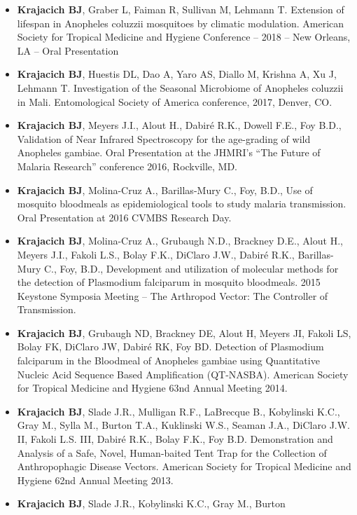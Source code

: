 \documentclass[11pt, a4paper]{awesome-cv}
\begin{document}
\begin{itemize}
\item
  \textbf{Krajacich BJ}, Graber L, Faiman R, Sullivan M, Lehmann T.
  Extension of lifespan in Anopheles coluzzii mosquitoes by climatic
  modulation. American Society for Tropical Medicine and Hygiene
  Conference -- 2018 -- New Orleans, LA -- Oral Presentation
\item
  \textbf{Krajacich BJ}, Huestis DL, Dao A, Yaro AS, Diallo M, Krishna
  A, Xu J, Lehmann T. Investigation of the Seasonal Microbiome of
  Anopheles coluzzii in Mali. Entomological Society of America
  conference, 2017, Denver, CO.
\item
  \textbf{Krajacich BJ}, Meyers J.I., Alout H., Dabiré R.K., Dowell
  F.E., Foy B.D., Validation of Near Infrared Spectroscopy for the
  age-grading of wild Anopheles gambiae. Oral Presentation at the
  JHMRI's ``The Future of Malaria Research'' conference 2016, Rockville,
  MD.
\item
  \textbf{Krajacich BJ}, Molina-Cruz A., Barillas-Mury C., Foy, B.D.,
  Use of mosquito bloodmeals as epidemiological tools to study malaria
  transmission. Oral Presentation at 2016 CVMBS Research Day.
\item
  \textbf{Krajacich BJ}, Molina-Cruz A., Grubaugh N.D., Brackney D.E.,
  Alout H., Meyers J.I., Fakoli L.S., Bolay F.K., DiClaro J.W., Dabiré
  R.K., Barillas-Mury C., Foy, B.D., Development and utilization of
  molecular methods for the detection of Plasmodium falciparum in
  mosquito bloodmeals. 2015 Keystone Symposia Meeting -- The Arthropod
  Vector: The Controller of Transmission.
\item
  \textbf{Krajacich BJ}, Grubaugh ND, Brackney DE, Alout H, Meyers JI,
  Fakoli LS, Bolay FK, DiClaro JW, Dabiré RK, Foy BD. Detection of
  Plasmodium falciparum in the Bloodmeal of Anopheles gambiae using
  Quantitative Nucleic Acid Sequence Based Amplification (QT-NASBA).
  American Society for Tropical Medicine and Hygiene 63nd Annual Meeting
  2014.
\item
  \textbf{Krajacich BJ}, Slade J.R., Mulligan R.F., LaBrecque B.,
  Kobylinski K.C., Gray M., Sylla M., Burton T.A., Kuklinski W.S.,
  Seaman J.A., DiClaro J.W. II, Fakoli L.S. III, Dabiré R.K., Bolay
  F.K., Foy B.D. Demonstration and Analysis of a Safe, Novel,
  Human-baited Tent Trap for the Collection of Anthropophagic Disease
  Vectors. American Society for Tropical Medicine and Hygiene 62nd
  Annual Meeting 2013.
\item
  \textbf{Krajacich BJ}, Slade J.R., Kobylinski K.C., Gray M., Burton

\end{itemize}
\end{document}

